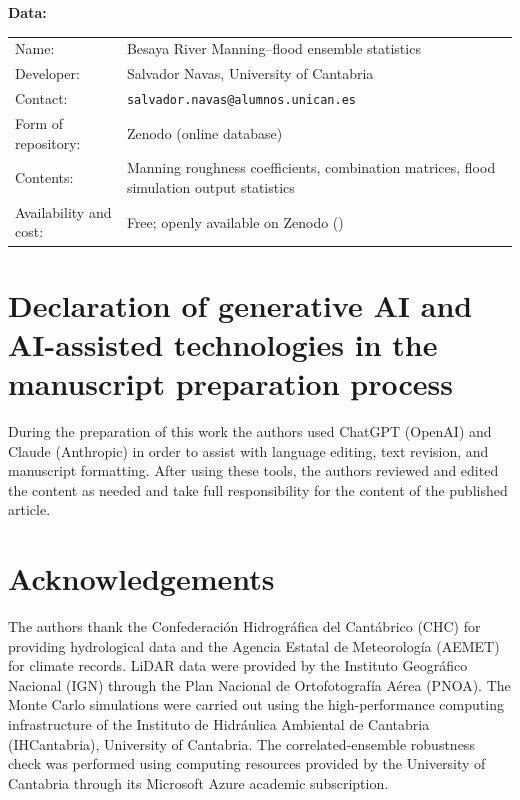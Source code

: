 \documentclass[a4paper,fleqn]{cas-sc}
\begin{document}
\medskip
\noindent\textbf{Data:}

\smallskip
\begin{tabular}{@{}p{4.5cm}p{9cm}@{}}
Name:                  & Besaya River Manning--flood ensemble statistics \\
Developer:             & Salvador Navas, University of Cantabria \\
Contact:               & \texttt{salvador.navas@alumnos.unican.es} \\
Form of repository:    & Zenodo (online database) \\
Contents:              & Manning roughness coefficients, combination matrices,
                         flood simulation output statistics \\
Availability and cost: & Free; openly available on Zenodo
                         (\citealp{navas2026zenodo}) \\
\end{tabular}

\section*{Declaration of generative AI and AI-assisted technologies
in the manuscript preparation process}
During the preparation of this work the authors used ChatGPT (OpenAI) and
Claude (Anthropic) in order to assist with language editing, text revision,
and manuscript formatting. After using these tools, the authors reviewed and
edited the content as needed and take full responsibility for the content of
the published article.

\section*{Acknowledgements}
The authors thank the Confederaci\'on Hidrogr\'afica del Cant\'abrico (CHC)
for providing hydrological data and the Agencia Estatal de Meteorolog\'ia
(AEMET) for climate records. LiDAR data were provided by the Instituto
Geogr\'afico Nacional (IGN) through the Plan Nacional de Ortofotograf\'ia
A\'erea (PNOA). The Monte Carlo simulations were carried out using the
high-performance computing infrastructure of the Instituto de Hidráulica
Ambiental de Cantabria (IHCantabria), University of Cantabria. The
correlated-ensemble robustness check was performed using computing resources
provided by the University of Cantabria through its Microsoft Azure academic
subscription.



\end{document}
